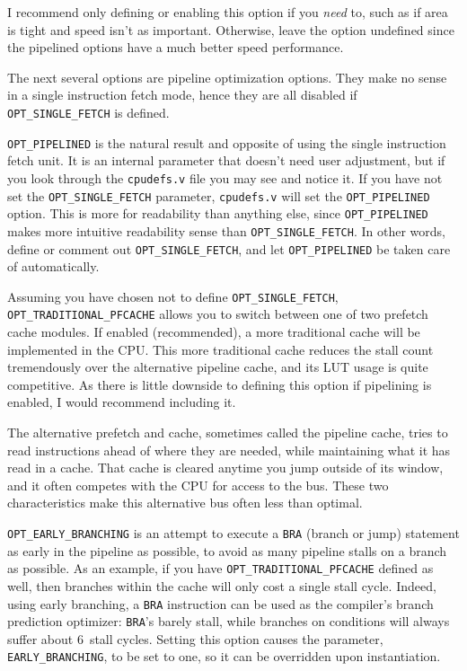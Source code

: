\documentclass{gqtekspec}
\begin{document}
I recommend only defining or enabling this option if you {\em need} to,
such as if area is tight and speed isn't as important.  Otherwise, leave the
option undefined since the pipelined options have a much better speed
performance.

The next several options are pipeline optimization options.  They make no
sense in a single instruction fetch mode, hence they are all disabled if
{\tt OPT\_SINGLE\_FETCH} is defined.

{\tt OPT\_PIPELINED} is the natural result and opposite of using the single 
instruction fetch unit.  It is an internal parameter that doesn't need user
adjustment, but if you look through the {\tt cpudefs.v} file you may see
and notice it.  If you have not set the {\tt OPT\_SINGLE\_FETCH} parameter,
{\tt cpudefs.v} will set the {\tt OPT\_PIPELINED} option.  This is more for
readability than anything else, since {\tt OPT\_PIPELINED} makes more
intuitive readability sense than {\tt OPT\_SINGLE\_FETCH}.  In other words,
define or comment out {\tt OPT\_SINGLE\_FETCH}, and let {\tt OPT\_PIPELINED} be
taken care of automatically.

Assuming you have chosen not to define {\tt OPT\_SINGLE\_FETCH},
{\tt OPT\_TRADITIONAL\_PFCACHE} allows you to switch between one of two
prefetch cache modules.  If enabled (recommended), a more traditional cache 
will be implemented in the CPU.  This more traditional cache reduces
the stall count tremendously over the alternative pipeline cache, and its
LUT usage is quite competitive.  As there is little downside to defining
this option if pipelining is enabled, I would recommend including it.

The alternative prefetch and cache, sometimes called the pipeline cache, tries
to read instructions ahead of where they are needed, while maintaining what it
has read in a cache.  That cache is cleared anytime you jump outside of its
window, and it often competes with the CPU for access to the bus.  These
two characteristics make this alternative bus often less than optimal.


{\tt OPT\_EARLY\_BRANCHING} is an attempt to execute a {\tt BRA} (branch or
jump) statement as early
in the pipeline as possible, to avoid as many pipeline stalls on a branch as
possible.  As an example, if you have {\tt OPT\_TRADITIONAL\_PFCACHE} defined
as well, then branches within the cache will only cost a single stall cycle.
Indeed, using early branching, a {\tt BRA} instruction can be used as the
compiler's branch prediction optimizer: {\tt BRA}'s barely stall, while
branches on conditions will always suffer about 6~stall cycles.  Setting
this option causes the parameter, {\tt EARLY\_BRANCHING}, to be set to one,
so it can be overridden upon instantiation.
\end{document}
